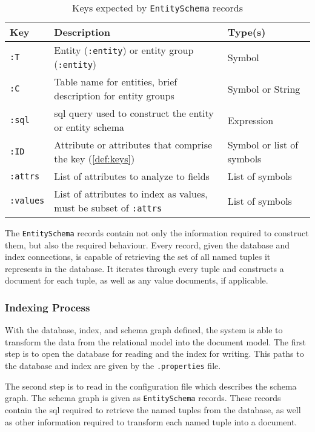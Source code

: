 			\begin{table}
				\centering
				
				\begin{tabular}{lp{9cm}l}
					\toprule
					Key & Description & Type(s) \\
					\midrule
					\texttt{:T} & Entity (\texttt{:entity}) or entity group (\texttt{:entity}) & Symbol \\
					\texttt{:C} & Table name for entities, brief description for entity groups & Symbol or String \\
					\texttt{:sql} & \Gls{sql} query used to construct the entity or entity schema & Expression \\
					\texttt{:ID} & Attribute or attributes that comprise the key (\vref{def:keys}) & Symbol or list of symbols \\
					\texttt{:attrs} & List of attributes to analyze to fields & List of symbols \\
					\texttt{:values} & List of attributes to index as values, must be subset of \texttt{:attrs} & List of symbols \\
					\bottomrule
				\end{tabular}
				
				\caption{Keys expected by \texttt{EntitySchema} records}
				\label{tbl:entity-schema-keys}
			\end{table}
			
			The \texttt{EntitySchema} records contain not only the information required to construct them, but also the required behaviour.  Every record, given the database and index connections, is capable of retrieving the set of all named tuples it represents in the database.  It iterates through every tuple and constructs a document for each tuple, as well as any value documents, if applicable.
			
		\subsubsection{Indexing Process}
			With the database, index, and schema graph defined, the system is able to transform the data from the relational model into the document model.  The first step is to open the database for reading and the index for writing.  This paths to the database and index are given by the \texttt{.properties} file.
			
			The second step is to read in the configuration file which describes the schema graph.  The schema graph is given as \texttt{EntitySchema} records.  These records contain the \gls{sql} required to retrieve the named tuples from the database, as well as other information required to transform each named tuple into a document.
			
